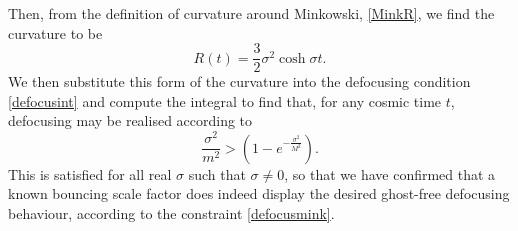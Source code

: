 Then, from the definition of curvature around Minkowski, \eqref{MinkR}, we find the curvature to be
\[
R(t)=\frac{3}{2}\sigma^2 \cosh\sigma t
.\]
We then substitute this form of the curvature into the defocusing condition \eqref{defocusint} and compute the integral to find that, for any cosmic time $t$, defocusing may be realised according to
\[
\frac{\sigma^{2}}{m^{2}}>(1-e^{-\frac{\sigma^{2}}{M^{2}}}).
\]
This is satisfied for all real $\sigma$ such that $\sigma\neq0$,
so that we have confirmed that a known bouncing scale factor does indeed display the desired ghost-free defocusing behaviour, according to the constraint \eqref{defocusmink}.
